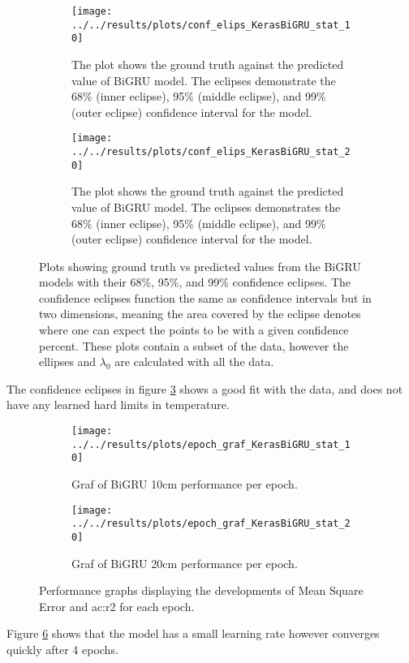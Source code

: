 \begin{figure}
	\begin{subfigure}{0.45\linewidth}
		\centering
		\texttt{[image: ../../results/plots/conf\_elips\_KerasBiGRU\_stat\_10]}
		\caption[Confidence eclipse of BiGRU model 10cm]{The plot shows the ground truth against the predicted value of BiGRU model. The eclipses demonstrate the 68\% (inner eclipse), 95\% (middle eclipse), and 99\% (outer eclipse) confidence interval for the model.}
		\label{fig:confelipsKerasBiGRUstat10}
	\end{subfigure}
	\hfill
	\begin{subfigure}{0.45\textwidth}
		\centering
		\texttt{[image: ../../results/plots/conf\_elips\_KerasBiGRU\_stat\_20]}
		\caption[Confidence eclipse of BiGRU model 20cm]{The plot shows the ground truth against the predicted value of BiGRU model. The eclipses demonstrates the 68\% (inner eclipse), 95\% (middle eclipse), and 99\% (outer eclipse) confidence interval for the model.}
		\label{fig:confelipsKerasBiGRUstat20}
	\end{subfigure}
	\caption{Plots showing ground truth vs predicted values from the BiGRU models with their 68\%, 95\%, and 99\% confidence eclipses. The confidence eclipses function the same as confidence intervals but in two dimensions, meaning the area covered by the eclipse denotes where one can expect the points to be with a given confidence percent. These plots contain a subset of the data, however the ellipses and $\lambda_0$ are calculated with all the data.}
	\label{fig:bigru:eclipse}
\end{figure}

The confidence eclipses in figure \ref{fig:bigru:eclipse} shows a good fit with the data, and does not have any learned hard limits in temperature. 

\begin{figure}
	\begin{subfigure}{0.45\textwidth}
		\centering
		\begin{adjustwidth}{-1in}{-1in}
			\texttt{[image: ../../results/plots/epoch\_graf\_KerasBiGRU\_stat\_10]}
		\end{adjustwidth}
		\caption[Epoch graph BiGRU 10cm]{Graf of BiGRU 10cm performance per epoch.}
		\label{fig:epochgrafKerasBiGRUstat10}
	\end{subfigure}
	\begin{subfigure}{0.45\textwidth}
		\centering
		\begin{adjustwidth}{-1in}{-1in}
			\texttt{[image: ../../results/plots/epoch\_graf\_KerasBiGRU\_stat\_20]}
		\end{adjustwidth}
		\caption[Epoch graph BiGRU 20cm]{Graf of BiGRU 20cm performance per epoch.}
		\label{fig:epochgrafKerasBiGRUstat20}
	\end{subfigure}
	\caption{Performance graphs displaying the developments of Mean Square Error and \acrfull{ac:r2} for each epoch.}
	\label{fig:bigru:epoch}
\end{figure}

Figure \ref{fig:bigru:epoch} shows that the model has a small learning rate however converges quickly after 4 epochs.





